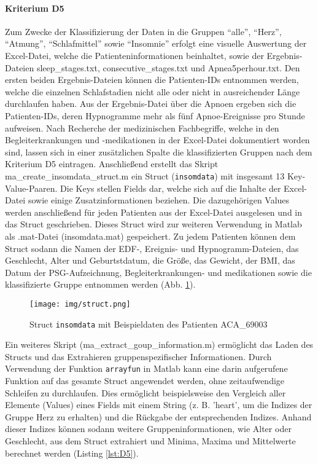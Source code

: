 \paragraph{Kriterium D5} Zum Zwecke der Klassifizierung der Daten in die Gruppen "`alle"', "`Herz"', "`Atmung"', "`Schlafmittel"' sowie "`Insomnie"' erfolgt eine visuelle Auswertung der Excel-Datei, welche die Patienteninformationen beinhaltet, sowie der Ergebnis-Dateien sleep\_stages.txt, consecutive\_stages.txt und Apnea5perhour.txt. Den ersten beiden Ergebnis-Dateien können die Patienten-IDs entnommen werden, welche die einzelnen Schlafstadien nicht alle oder nicht in ausreichender Länge durchlaufen haben. Aus der Ergebnis-Datei über die Apnoen ergeben sich die Patienten-IDs, deren Hypnogramme mehr als fünf Apnoe-Ereignisse pro Stunde aufweisen. Nach Recherche der medizinischen Fachbegriffe, welche in den Begleiterkrankungen und -medikationen in der Excel-Datei dokumentiert worden sind, lassen sich in einer zusätzlichen Spalte die klassifizierten Gruppen nach dem Kriterium D5 eintragen. Anschließend erstellt das Skript ma\_create\_insomdata\_struct.m ein Struct (\texttt{insomdata}) mit insgesamt 13 Key-Value-Paaren. Die Keys stellen Fields dar, welche sich auf die Inhalte der Excel-Datei sowie einige Zusatzinformationen beziehen. Die dazugehörigen Values werden anschließend für jeden Patienten aus der Excel-Datei ausgelesen und in das Struct geschrieben. Dieses Struct wird zur weiteren Verwendung in Matlab als .mat-Datei (insomdata.mat) gespeichert. Zu jedem Patienten können dem Struct sodann die Namen der \acs{EDF}-, Ereignis- und Hypnogramm-Dateien, das Geschlecht, Alter und Geburtstdatum, die Größe, das Gewicht, der \acs{BMI}, das Datum der \acs{PSG}-Aufzeichnung, Begleiterkrankungen- und medikationen sowie die klassifizierte Gruppe entnommen werden (Abb. \ref{fig:struct}). 

\begin{figure}[H]
	\centering
	\texttt{[image: img/struct.png]}
	\caption[Struct \texttt{insomdata} mit Beispieldaten]{Struct \texttt{insomdata} mit Beispieldaten des Patienten ACA\_69003}
	\label{fig:struct}
\end{figure}

Ein weiteres Skript (ma\_extract\_goup\_information.m) ermöglicht das Laden des Structs und das Extrahieren gruppenspezifischer Informationen. Durch Verwendung der Funktion \texttt{arrayfun} in Matlab kann eine darin aufgerufene Funktion auf das gesamte Struct angewendet werden, ohne zeitaufwendige Schleifen zu durchlaufen. Dies ermöglicht beispielsweise den Vergleich aller Elemente (Values) eines Fields mit einem String (z. B. 'heart', um die Indizes der Gruppe Herz zu erhalten) und die Rückgabe der entsprechenden Indizes. Anhand dieser Indizes können sodann weitere Gruppeninformationen, wie Alter oder Geschlecht, aus dem Struct extrahiert und Minima, Maxima und Mittelwerte berechnet werden (Listing \ref{lst:D5}).\\

